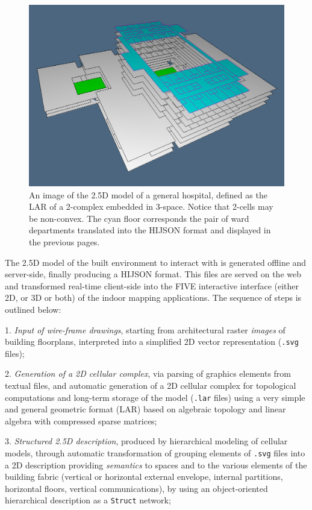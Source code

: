 \begin{figure}[ptb] %
 \centering
 \includegraphics[width=\linewidth]{images/hospital2} 
 \caption{An image of the 2.5D model of a general hospital, defined as the LAR of a 2-complex embedded in 3-space. Notice that 2-cells may be non-convex. The cyan floor corresponds the pair of ward departments translated into the HIJSON format and displayed in the previous pages.}
 \label{fig:hospital2}
\end{figure}

The 2.5D model of the built environment to interact with is generated offline and server-side, finally producing a HIJSON format. This  files are served on the web and transformed real-time client-side into the FIVE interactive interface (either 2D, or 3D or both) of the indoor mapping applications. The sequence of steps is outlined below:

1. \textit{Input of wire-frame drawings},
  starting from architectural  raster \emph{images} of building floorplans, interpreted into a simplified 2D vector representation (\texttt{.svg} files);

2. \textit{Generation of a 2D cellular complex}, via
  parsing of graphics elements from textual files, and automatic generation of a 2D cellular complex for topological computations and long-term storage of the model (\texttt{.lar} files) using a very simple and general geometric format (LAR) based on algebraic topology and linear algebra with compressed sparse matrices;

3. \textit{Structured 2.5D description}, produced by
  hierarchical modeling of cellular models, through automatic transformation of  grouping elements of \texttt{.svg} files into a 2D description providing \emph{semantics} to spaces and  to the various elements of the building fabric (vertical or horizontal external envelope, internal partitions, horizontal floors, vertical communications), by using an object-oriented hierarchical description as a  \texttt{Struct} network;

